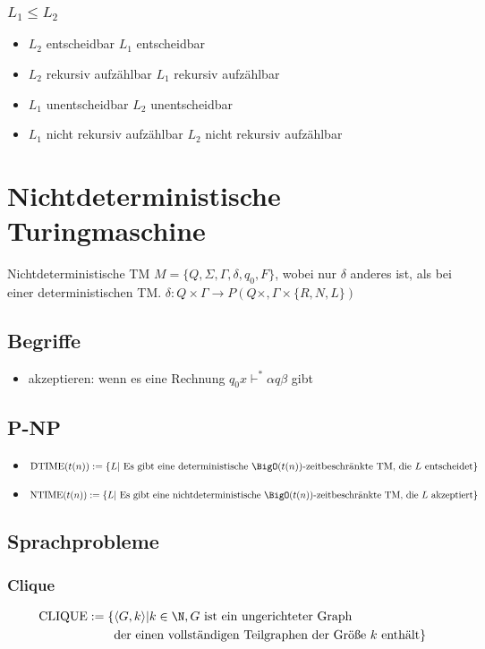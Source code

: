 \documentclass{article}
\begin{document}
\subsubsection{$L_1\leq L_2$}
\begin{itemize}
	\item $L_2$ entscheidbar \Rightarrow $L_1$ entscheidbar
	\item $L_2$ rekursiv aufzählbar \Rightarrow $L_1$ rekursiv aufzählbar
	\item $L_1$ unentscheidbar \Rightarrow $L_2$ unentscheidbar
	\item $L_1$ nicht rekursiv aufzählbar \Rightarrow $L_2$ nicht rekursiv aufzählbar
\end{itemize}
\section{Nichtdeterministische Turingmaschine}
Nichtdeterministische TM $M=\{Q, \Sigma, \Gamma, \delta, q_0, F\}$, wobei nur $\delta$ anderes ist, als bei einer deterministischen TM. $\delta: Q\times \Gamma \to P(Q\times, \Gamma \times \{R, N, L\})$
\subsection{Begriffe}
\begin{itemize}
	\item akzeptieren: wenn es eine Rechnung $q_0x\vdash^*\alpha q\beta$ gibt
\end{itemize}
\subsection{P-NP}
\begin{itemize}
	\item $\text{DTIME}(t(n)):=\{L|\text{ Es gibt eine deterministische }\BigO(t(n)) \text{-zeitbeschränkte TM, die } L \text{ entscheidet}\}$
	\item $\text{NTIME}(t(n)):=\{L|\text{ Es gibt eine nichtdeterministische }\BigO(t(n)) \text{-zeitbeschränkte TM, die } L \text{ akzeptiert}\}$
\end{itemize}
\subsection{Sprachprobleme}
\subsubsection{Clique}
\begin{align*}
	\text{CLIQUE}:=\{&\langle G, k \rangle|k\in \N, G \text{ ist ein ungerichteter Graph} \\
	&\text{der einen vollständigen Teilgraphen der Größe } k \text{ enthält}\}
\end{align*}
\end{document}
